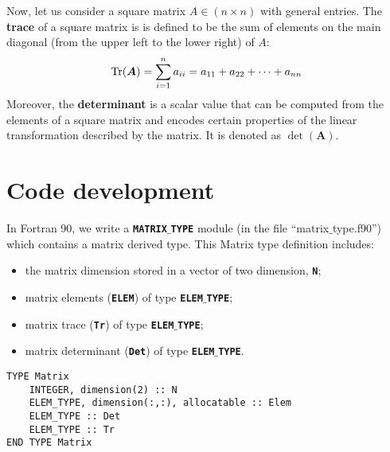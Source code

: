 \documentclass[rmp,10pt,onecolumn,fleqn,notitlepage]{revtex4-1}
\begin{document}
Now, let us consider a square matrix \( A \in (n\times n) \) with general entries. The \textbf{trace} of a square matrix is is defined to be the sum of elements on the main diagonal (from the upper left to the lower right) of \( A \):
\begin{equation}
  \Tr(\boldsymbol{A}) = \sum_{i=1}^{n} a_{ii}  = a_{11} + a_{22} + \dots + a_{nn}
\end{equation}
Moreover, the \textbf{determinant} is a scalar value that can be computed from the elements of a square matrix and encodes certain properties of the linear transformation described by the matrix. It is denoted as \( \det(\boldsymbol{A})  \).


\section{Code development}
In Fortran 90, we write a {\bfseries\texttt{MATRIX$\_$TYPE}} module (in the file “matrix$\_$type.f90”) which contains a matrix derived type. This Matrix type definition includes:

    \begin{center}
      \begin{minipage}[t]{0.43\linewidth}%

          \begin{itemize}
          \item the matrix dimension stored in a vector of two dimension, {\bfseries\texttt{N}};
          \item matrix elements ({\bfseries\texttt{ELEM}}) of type {\bfseries\texttt{ELEM}$\_$\texttt{TYPE}};
          \item matrix trace ({\bfseries\texttt{Tr}}) of type {\bfseries\texttt{ELEM}$\_$\texttt{TYPE}};
          \item matrix determinant ({\bfseries\texttt{Det}}) of type {\bfseries\texttt{ELEM}$\_$\texttt{TYPE}}.
          \end{itemize}

      \end{minipage}
      \hspace{0.8cm}
      \begin{minipage}[t]{0.49\linewidth}%
\begin{lstlisting}[style=Fortran]
TYPE Matrix
    INTEGER, dimension(2) :: N
    ELEM_TYPE, dimension(:,:), allocatable :: Elem
    ELEM_TYPE :: Det
    ELEM_TYPE :: Tr
END TYPE Matrix
\end{lstlisting}
      \end{minipage}
    \end{center}
\end{document}
